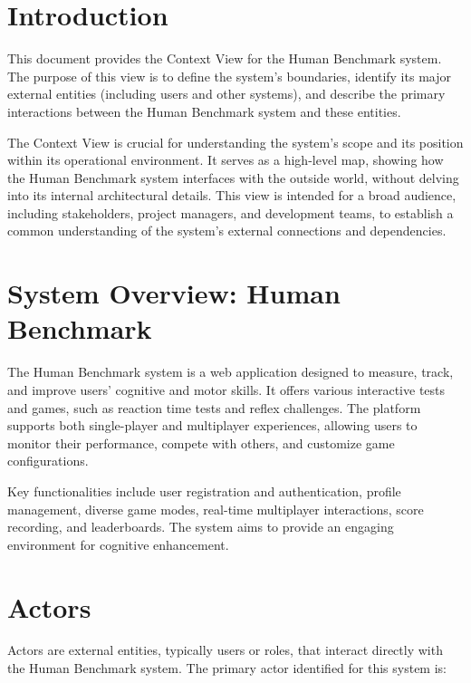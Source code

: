 

\section{Introduction}
This document provides the Context View for the Human Benchmark system. The purpose of this view is to define the system's boundaries, identify its major external entities (including users and other systems), and describe the primary interactions between the Human Benchmark system and these entities. 

The Context View is crucial for understanding the system's scope and its position within its operational environment. It serves as a high-level map, showing how the Human Benchmark system interfaces with the outside world, without delving into its internal architectural details. This view is intended for a broad audience, including stakeholders, project managers, and development teams, to establish a common understanding of the system's external connections and dependencies.

\section{System Overview: Human Benchmark}
The Human Benchmark system is a web application designed to measure, track, and improve users' cognitive and motor skills. It offers various interactive tests and games, such as reaction time tests and reflex challenges. The platform supports both single-player and multiplayer experiences, allowing users to monitor their performance, compete with others, and customize game configurations.

Key functionalities include user registration and authentication, profile management, diverse game modes, real-time multiplayer interactions, score recording, and leaderboards. The system aims to provide an engaging environment for cognitive enhancement.

\section{Actors}
Actors are external entities, typically users or roles, that interact directly with the Human Benchmark system. The primary actor identified for this system is:

